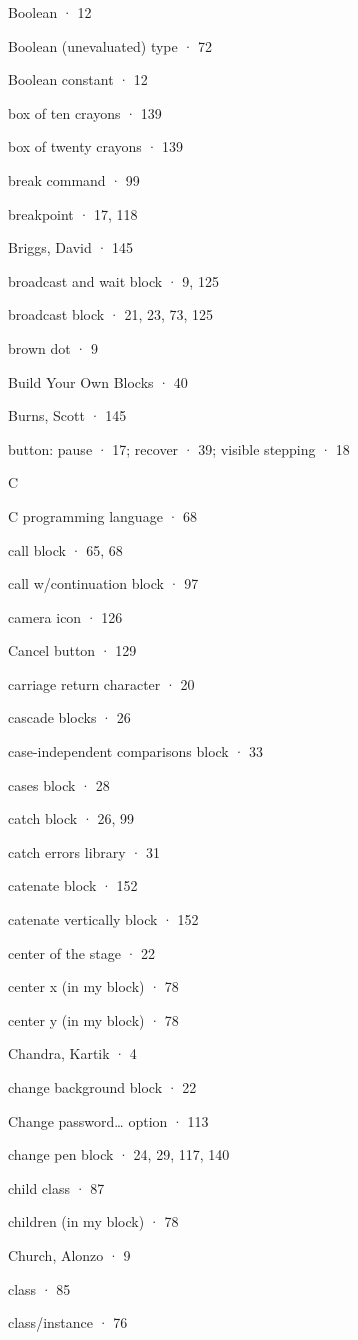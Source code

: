 Boolean · 12

Boolean (unevaluated) type · 72

Boolean constant · 12

box of ten crayons · 139

box of twenty crayons · 139

break command · 99

breakpoint · 17, 118

Briggs, David · 145

broadcast and wait block · 9, 125

broadcast block · 21, 23, 73, 125

brown dot · 9

Build Your Own Blocks · 40

Burns, Scott · 145

button: pause · 17; recover · 39; visible stepping · 18

C

C programming language · 68

call block · 65, 68

call w/continuation block · 97

camera icon · 126

Cancel button · 129

carriage return character · 20

cascade blocks · 26

case-independent comparisons block · 33

cases block · 28

catch block · 26, 99

catch errors library · 31

catenate block · 152

catenate vertically block · 152

center of the stage · 22

center x (in my block) · 78

center y (in my block) · 78

Chandra, Kartik · 4

change background block · 22

Change password\ldots{} option · 113

change pen block · 24, 29, 117, 140

child class · 87

children (in my block) · 78

Church, Alonzo · 9

class · 85

class/instance · 76

